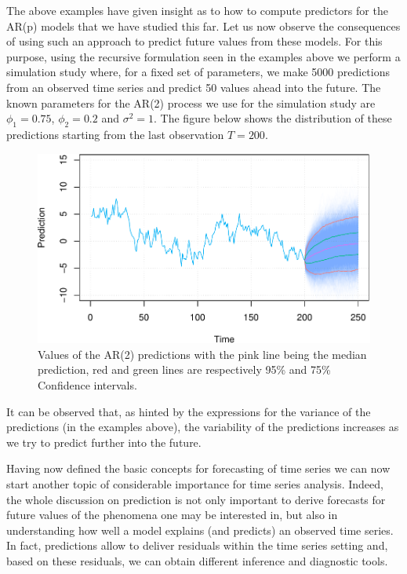 \documentclass[]{book}
\theoremstyle{definition}
\theoremstyle{definition}
\theoremstyle{definition}
\theoremstyle{remark}
\begin{document}
The above examples have given insight as to how to compute predictors
for the AR(p) models that we have studied this far. Let us now observe
the consequences of using such an approach to predict future values from
these models. For this purpose, using the recursive formulation seen in
the examples above we perform a simulation study where, for a fixed set
of parameters, we make 5000 predictions from an observed time series and
predict 50 values ahead into the future. The known parameters for the
AR(2) process we use for the simulation study are \(\phi _1 = 0.75\),
\(\phi _2 = 0.2\) and \(\sigma^2 = 1\). The figure below shows the
distribution of these predictions starting from the last observation
\(T = 200\).

\begin{figure}
\centering
\includegraphics{ts_files/figure-latex/predplot-1.pdf}
\caption{\label{fig:predplot}Values of the AR(2) predictions with the pink
line being the median prediction, red and green lines are respectively
95\% and 75\% Confidence intervals.}
\end{figure}

It can be observed that, as hinted by the expressions for the variance
of the predictions (in the examples above), the variability of the
predictions increases as we try to predict further into the future.

Having now defined the basic concepts for forecasting of time series we
can now start another topic of considerable importance for time series
analysis. Indeed, the whole discussion on prediction is not only
important to derive forecasts for future values of the phenomena one may
be interested in, but also in understanding how well a model explains
(and predicts) an observed time series. In fact, predictions allow to
deliver residuals within the time series setting and, based on these
residuals, we can obtain different inference and diagnostic tools.
\end{document}
